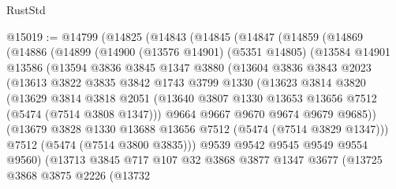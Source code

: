 \begin{lexlean}{RustStd}
\begin{coremodule}
@15019 := @14799
    (@14825
      (@14843
        (@14845
          (@14847
            (@14859
              (@14869
                (@14886
                  (@14899
                    (@14900
                      (@13576 @14901)
                      (@5351 @14805)
                      (@13584
                        @14901
                        @13586
                        (@13594
                          @3836
                          @3845
                          @1347
                          @3880
                          (@13604
                            @3836
                            @3843
                            @2023
                            (@13613
                              @3822
                              @3835
                              @3842
                              @1743
                              @3799
                              @1330
                              (@13623
                                @3814
                                @3820
                                (@13629
                                  @3814
                                  @3818
                                  @2051
                                  (@13640
                                    @3807
                                    @1330
                                    @13653
                                    @13656
                                    @7512
                                    (@5474 (@7514 @3808 @1347)))
                                  @9664
                                  @9667
                                  @9670
                                  @9674
                                  @9679
                                  @9685))
                              (@13679 @3828 @1330 @13688 @13656 @7512 (@5474 (@7514 @3829 @1347)))
                              @7512
                              (@5474 (@7514 @3800 @3835)))
                            @9539
                            @9542
                            @9545
                            @9549
                            @9554
                            @9560)
                          (@13713
                            @3845
                            @717
                            @107
                            @32
                            @3868
                            @3877
                            @1347
                            @3677
                            (@13725
                              @3868
                              @3875
                              @2226
                              (@13732

\end{coremodule}
\end{lexlean}
